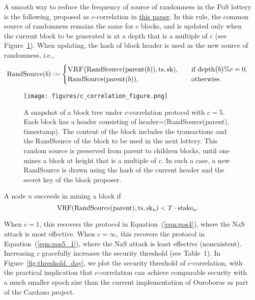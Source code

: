 \documentclass{article}
\begin{document}
A smooth way to reduce the frequency of source of randomness in the PoS lottery is the following, proposed as $c$-correlation  in \href{https://arxiv.org/pdf/1910.02218.pdf}{this paper}. In this rule, the common source of randomness remains the same for $c$ blocks, and is updated only when the current block to be generated is at a depth that is a multiple of $c$ (see Figure~\ref{fig:c-correction-protocol}). When updating, the hash of block header is used as the new source of randomness, i.e.,
\begin{align*}
{\rm RandSource}(b):=  
\begin{cases}
\text{\sc VRF}\big({\rm RandSource}(\text{parent}(b)), {\rm ts}, {\rm sk}) , &\quad \text{if } {\rm depth}\big(b\big)\%c=0,\\
{\rm RandSource}(\text{parent}(b)), &\quad \text{otherwise}.
\end{cases}
\end{align*}

\begin{figure}
    \centering
\texttt{[image: figures/c\_correlation\_figure.png]}
\caption{A snapshot of a block tree under $c$-correlation protocol with $c = 5$. Each block has a header consisting of header=(RandSource(parent), timestamp).  The content of the block includes the transactions and the RandSource of the block to be used in the next lottery. This random source is preserved from parent to children blocks, until one mines a block at height that is a multiple of $c$. In such a case, a new RandSource is drawn using the hash of the current header and the secret key of the block proposer. }
\label{fig:c-correction-protocol}
\end{figure}

 A node $n$ succeeds in mining a block if
\begin{equation}
    \label{eqn:pos5_2}
    {\rm VRF(RandSource(parent),ts,sk_n)} < T\cdot{\rm stake_n}.
\end{equation}

When $c=1$, this recovers the protocol in Equation~(\ref{eqn:pos4}), where the NaS attack is most effective. When $c=\infty$, this recovers the protocol in Equation~(\ref{eqn:pos5_1}), where the NaS attack is least effective (nonexistent). 
Increasing $c$  gracefully increases the security threshold (see Table~1). In Figure~\ref{fig:threshold_day}, we plot the security threshold of $c$-correlation, with the practical implication that $c$-correlation can achieve comparable security with a much smaller epoch size than the current implementation of Ouroboros as part of the Cardano project.
\end{document}
